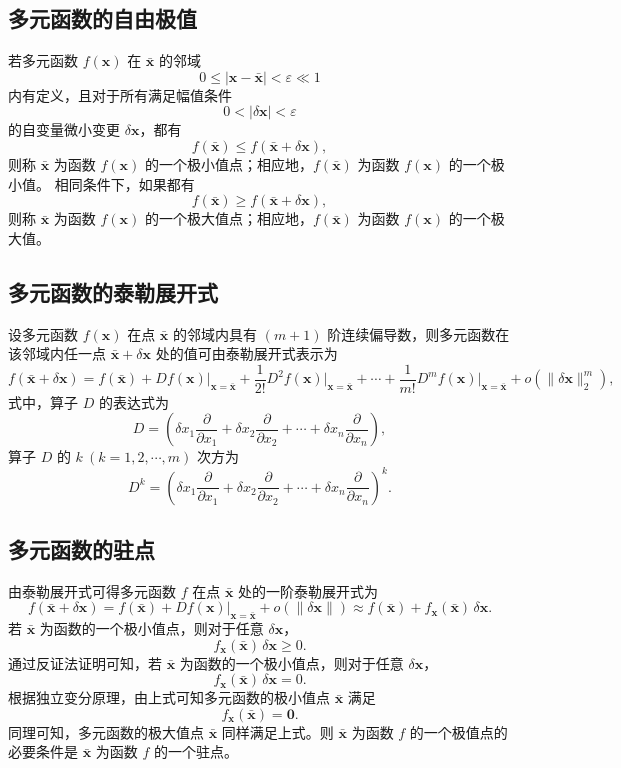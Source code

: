 \subsection{多元函数的自由极值}
若多元函数 $f(\boldsymbol{x})$ 在 $\bar{\boldsymbol{x}}$ 的邻域
\[
0\leq|\boldsymbol{x}-\bar{\boldsymbol{x}}|<\varepsilon\ll1
\]
内有定义，且对于所有满足幅值条件
\[
0<|\delta\boldsymbol{x}|<\varepsilon
\]
的自变量微小变更 $\delta\boldsymbol{x}$，都有
\[
f(\bar{\boldsymbol{x}})\leq f(\bar{\boldsymbol{x}}+\delta\boldsymbol{x}),
\]
则称 $\bar{\boldsymbol{x}}$ 为函数 $f(\boldsymbol{x})$ 的一个极小值点；相应地，$f(\bar{\boldsymbol{x}})$ 为函数 $f(\boldsymbol{x})$ 的一个极小值。
相同条件下，如果都有
\[
f(\bar{\boldsymbol{x}})\geq f(\bar{\boldsymbol{x}}+\delta\boldsymbol{x}),
\]
则称 $\bar{\boldsymbol{x}}$ 为函数 $f(\boldsymbol{x})$ 的一个极大值点；相应地，$f(\bar{\boldsymbol{x}})$ 为函数 $f(\boldsymbol{x})$ 的一个极大值。
\subsection{多元函数的泰勒展开式}
设多元函数 $f(\boldsymbol{x})$ 在点 $\bar{\boldsymbol{x}}$ 的邻域内具有 $(m+1)$ 阶连续偏导数，则多元函数在该邻域内任一点 $\bar{\boldsymbol{x}}+\delta\boldsymbol{x}$ 处的值可由泰勒展开式表示为
\[
f(\bar{\boldsymbol{x}}+\delta\boldsymbol{x})=f(\bar{\boldsymbol{x}})+Df(\boldsymbol{x})\big|_{\boldsymbol{x}=\bar{\boldsymbol{x}}}+\frac{1}{2!}D^2f(\boldsymbol{x})\big|_{\boldsymbol{x}=\bar{\boldsymbol{x}}}+\cdots+\frac{1}{m!}D^mf(\boldsymbol{x})\big|_{\boldsymbol{x}=\bar{\boldsymbol{x}}}+o(\|\delta\boldsymbol{x}\|_2^m),
\]
式中，算子 $D$ 的表达式为
\[
D=\left(\delta x_1\frac{\partial}{\partial x_1}+\delta x_2\frac{\partial}{\partial x_2}+\cdots+\delta x_n\frac{\partial}{\partial x_n}\right),
\]
算子 $D$ 的 $k\ (k=1,2,\cdots,m)$ 次方为
\[
D^k=\left(\delta x_1\frac{\partial}{\partial x_1}+\delta x_2\frac{\partial}{\partial x_2}+\cdots+\delta x_n\frac{\partial}{\partial x_n}\right)^k.
\]
\subsection{多元函数的驻点}
由泰勒展开式可得多元函数 $f$ 在点 $\bar{\boldsymbol{x}}$ 处的一阶泰勒展开式为
\[
f(\bar{\boldsymbol{x}}+\delta\boldsymbol{x})=f(\bar{\boldsymbol{x}})+Df(\boldsymbol{x})\big|_{\boldsymbol{x}=\bar{\boldsymbol{x}}}+o(\|\delta\boldsymbol{x}\|)\approx f(\bar{\boldsymbol{x}})+f_{\boldsymbol{x}}(\bar{\boldsymbol{x}})\,\delta\boldsymbol{x}.
\]
若 $\bar{\boldsymbol{x}}$ 为函数的一个极小值点，则对于任意 $\delta\boldsymbol{x}$，
\[
f_{\boldsymbol{x}}(\bar{\boldsymbol{x}})\,\delta\boldsymbol{x}\geq0.
\]
通过反证法证明可知，若 $\bar{\boldsymbol{x}}$ 为函数的一个极小值点，则对于任意 $\delta\boldsymbol{x}$，
\[
f_{\boldsymbol{x}}(\bar{\boldsymbol{x}})\,\delta\boldsymbol{x}=0.
\]
根据独立变分原理，由上式可知多元函数的极小值点 $\bar{\boldsymbol{x}}$ 满足
\[
f_{\boldsymbol{x}}(\bar{\boldsymbol{x}})=\boldsymbol{0}.
\]
同理可知，多元函数的极大值点 $\bar{\boldsymbol{x}}$ 同样满足上式。则 $\bar{\boldsymbol{x}}$ 为函数 $f$ 的一个极值点的必要条件是 $\bar{\boldsymbol{x}}$ 为函数 $f$ 的一个驻点。
